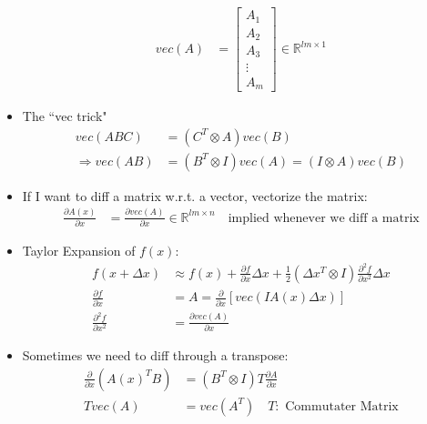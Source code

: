\documentclass[11pt]{article}
\begin{document}
\begin{itemize}
\begin{align*}
        \\
        vec(A) &= \begin{bmatrix}
            A_1 \\
            A_2 \\
            A_3 \\
            \vdots \\
            A_m
        \end{bmatrix} \in \mathbb{R}^{lm\times 1}
    \end{align*}
    \item The ``vec trick"
    \begin{align*}
        vec(ABC) &= (C^T\otimes A)vec(B)
        \\
        \Rightarrow vec(AB) &= (B^T\otimes I)vec(A) = (I\otimes A) vec(B)
    \end{align*}
    \item If I want to diff a matrix w.r.t. a vector, vectorize the matrix:
    \begin{align*}
        \frac{\partial A(x)}{\partial x} &= \frac{\partial vec(A)}{\partial x} \in\mathbb{R}^{lm\times n} \quad \text{implied whenever we diff a matrix}
    \end{align*}
    \item Taylor Expansion of $f(x)$:
    \begin{align*}
        f(x+\Delta x) &\approx f(x) + \frac{\partial f}{\partial x}\Delta x + \frac{1}{2}(\Delta x^T\otimes I)\frac{\partial^2 f}{\partial x^2}\Delta x
        \\
        \frac{\partial f}{\partial x} &= A = \frac{\partial}{\partial x}[vec(IA(x)\Delta x)]
        \\
        \frac{\partial^2 f}{\partial x^2} &= \frac{\partial vec(A)}{\partial x}
    \end{align*}
    \item Sometimes we need to diff through a transpose:
    \begin{align*}
        \frac{\partial }{\partial x}(A(x)^T B) &= (B^T\otimes I)T\frac{\partial A}{\partial x}
        \\
        Tvec(A) &= vec(A^T) \quad T: \text{ Commutater Matrix}
    \end{align*}
\end{itemize}
\end{document}
